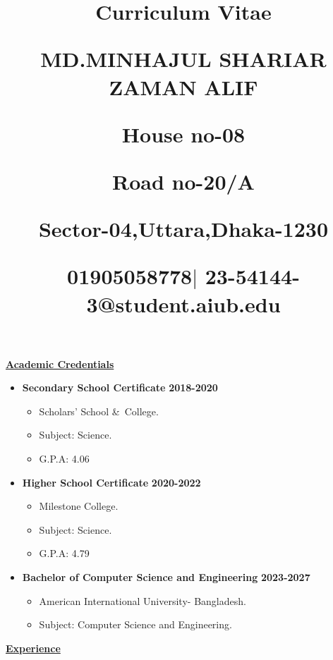 \documentclass[12pt]{article}
\title{Curriculum Vitae \par MD.MINHAJUL SHARIAR ZAMAN ALIF \par House no-08 \par Road no-20/A \par Sector-04,Uttara,Dhaka-1230 \par 01905058778$|$ 23-54144-3@student.aiub.edu}
\date{ }
\begin{document}
	\maketitle
	\begin{large}
		\underline {\textbf{Academic Credentials}} 
	\end{large}
	
	\begin{itemize}
		\item \textbf{Secondary School Certificate} \hfill \textbf{2018-2020}
		\begin{itemize}
			\item Scholars' School \&\ College.
			
			\item Subject: Science.
			\item G.P.A: 4.06
		\end{itemize}
		\item \textbf{Higher School Certificate} \hfill \textbf{2020-2022}
		\begin{itemize}
			\item Milestone College.
			\item Subject: Science.
			\item G.P.A: 4.79
		\end{itemize}
		\item \textbf{Bachelor of Computer Science and Engineering} \hfill \textbf{2023-2027}
		\begin{itemize}
			\item American International University- Bangladesh.
			\item Subject: Computer Science and Engineering.
		\end{itemize}
	\end{itemize} 
	
	\begin{large}
		\underline {\textbf{Experience}} 
	\end{large}
	
\end{document}
